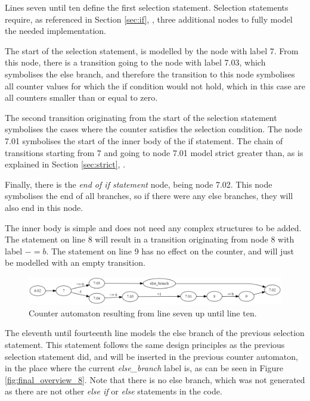 \documentclass[12pt]{article}
\begin{document}
Lines seven until ten define the first selection statement. Selection statements require, as referenced in Section \ref{sec:if}, , three additional nodes to fully model the needed implementation.

The start of the selection statement, is modelled by the node with label 7. From this node, there is a transition going to the node with label 7.03, which symbolises the else branch, and therefore the transition to this node symbolises all counter values for which the if condition would not hold, which in this case are all counters smaller than or equal to zero.

The second transition originating from the start of the selection statement symbolises the cases where the counter satisfies the selection condition. The node 7.01 symbolises the start of the inner body of the if statement. The chain of transitions starting from 7 and going to node 7.01 model strict greater than, as is explained in Section \ref{sec:strict}, .

Finally, there is the \textit{end of if statement} node, being node 7.02. This node symbolises the end of all branches, so if there were any else branches, they will also end in this node.

The inner body is simple and does not need any complex structures to be added. The statement on line 8 will result in a transition originating from node 8 with label $-= b$. The statement on line 9 has no effect on the counter, and will just be modelled with an empty transition.

\begin{figure}[h]
	\centering
	\includegraphics[width=\linewidth]{final_overview_7}
	\caption{Counter automaton resulting from line seven up until line ten.}
	\label{fig:final_overview_7}
\end{figure}

The eleventh until fourteenth line models the else branch of the previous selection statement. This statement follows the same design principles as the previous selection statement did, and will be inserted in the previous counter automaton, in the place where the current \textit{else\_branch} label is, as can be seen in Figure \ref{fig:final_overview_8}. Note that there is no else branch, which was not generated as there are not other \textit{else if} or \textit{else} statements in the code.
\end{document}
